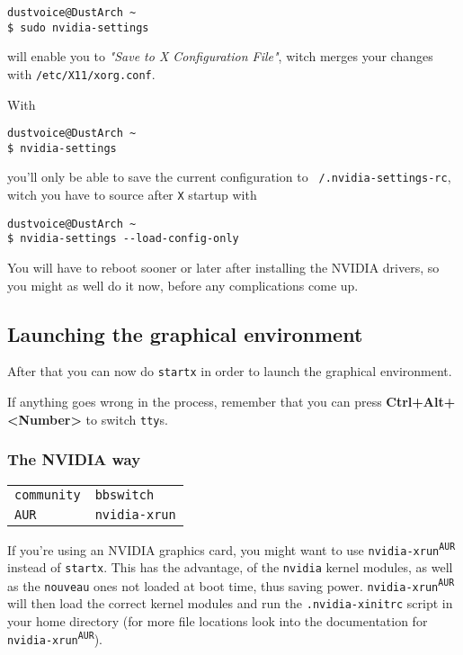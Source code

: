 \documentclass[9pt]{report}
\newenvironment{NOTE}
{\begin{tcolorbox}[colback=admonitionBG,coltitle=draculaFG,colframe=draculaBlue,colbacktitle=draculaBlue,title=NOTE]}
{\end{tcolorbox}}
\newenvironment{packagetable}
{\begin{longtabu}to \textwidth [b]{X[1,r]|X[1,l]}}
{\end{longtabu}}
\begin{document}
\begin{verbatim}
dustvoice@DustArch ~
$ sudo nvidia-settings
\end{verbatim}

will enable you to \emph{"Save to X Configuration File"}, witch merges your changes with \texttt{/etc/X11/xorg.conf}.


With


\begin{verbatim}
dustvoice@DustArch ~
$ nvidia-settings
\end{verbatim}

you’ll only be able to save the current configuration to \texttt{~/.nvidia-settings-rc}, witch you have to source after \texttt{X} startup with


\begin{verbatim}
dustvoice@DustArch ~
$ nvidia-settings --load-config-only
\end{verbatim}

\begin{NOTE}
    You will have to reboot sooner or later after installing the NVIDIA drivers, so you might as well do it now, before any complications come up.

\end{NOTE}

\newpage

\hypertarget{x-launching-the-graphical-environment}{\subsection{Launching the graphical environment}}
After that you can now do \texttt{startx} in order to launch the graphical environment.


If anything goes wrong in the process, remember that you can press \textbf{Ctrl+Alt+<Number>} to switch \texttt{tty}s.



\newpage

\hypertarget{x-the-nvidia-way}{\subsubsection{The NVIDIA way}}
\begin{packagetable}
    \texttt{community} & \texttt{bbswitch} \\ 
    \texttt{AUR} & \texttt{nvidia-xrun} \\ 
\end{packagetable}

If you’re using an NVIDIA graphics card, you might want to use \texttt{nvidia-xrun\textsuperscript{\texttt{AUR}}} instead of \texttt{startx}.
This has the advantage, of the \texttt{nvidia} kernel modules, as well as the \texttt{nouveau} ones not loaded at boot time, thus saving power.
\texttt{nvidia-xrun\textsuperscript{\texttt{AUR}}} will then load the correct kernel modules and run the \texttt{.nvidia-xinitrc} script in your home directory (for more file locations look into the documentation for \texttt{nvidia-xrun\textsuperscript{\texttt{AUR}}}).
\end{document}

